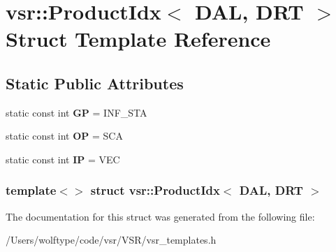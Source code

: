 \hypertarget{structvsr_1_1_product_idx_3_01_d_a_l_00_01_d_r_t_01_4}{\section{vsr\-:\-:Product\-Idx$<$ D\-A\-L, D\-R\-T $>$ Struct Template Reference}
\label{structvsr_1_1_product_idx_3_01_d_a_l_00_01_d_r_t_01_4}
}
\subsection*{Static Public Attributes}
\begin{DoxyCompactItemize}
\item 
\hypertarget{structvsr_1_1_product_idx_3_01_d_a_l_00_01_d_r_t_01_4_a59b3d0a7145b8fa1faf19b54ea032035}{static const int {\bfseries G\-P} = I\-N\-F\-\_\-\-S\-T\-A}\label{structvsr_1_1_product_idx_3_01_d_a_l_00_01_d_r_t_01_4_a59b3d0a7145b8fa1faf19b54ea032035}

\item 
\hypertarget{structvsr_1_1_product_idx_3_01_d_a_l_00_01_d_r_t_01_4_a6618231e0fdffa8c9c4e3e120a4e428a}{static const int {\bfseries O\-P} = S\-C\-A}\label{structvsr_1_1_product_idx_3_01_d_a_l_00_01_d_r_t_01_4_a6618231e0fdffa8c9c4e3e120a4e428a}

\item 
\hypertarget{structvsr_1_1_product_idx_3_01_d_a_l_00_01_d_r_t_01_4_a1533d29c7cdf97f5ce5761ca0290e493}{static const int {\bfseries I\-P} = V\-E\-C}\label{structvsr_1_1_product_idx_3_01_d_a_l_00_01_d_r_t_01_4_a1533d29c7cdf97f5ce5761ca0290e493}

\end{DoxyCompactItemize}
\subsubsection*{template$<$$>$ struct vsr\-::\-Product\-Idx$<$ D\-A\-L, D\-R\-T $>$}



The documentation for this struct was generated from the following file\-:\begin{DoxyCompactItemize}
\item 
/\-Users/wolftype/code/vsr/\-V\-S\-R/vsr\-\_\-templates.\-h\end{DoxyCompactItemize}
